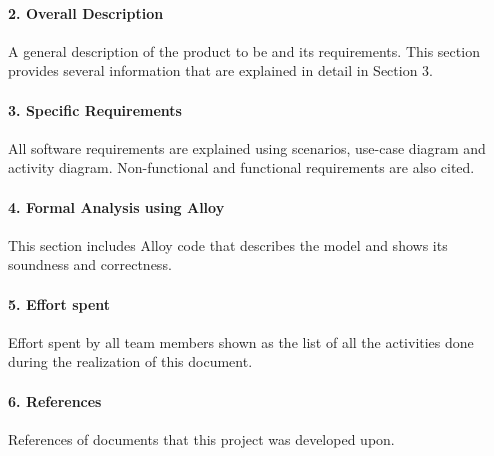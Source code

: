 \documentclass[../rasd.tex]{subfiles}
\begin{document}
		\paragraph{2. Overall Description}
		A general description of the product to be and its requirements. This section provides several information that are explained in detail in Section 3.
		\paragraph{3. Specific Requirements}
		All software requirements are explained using scenarios, use-case diagram and activity diagram. Non-functional and functional requirements are also cited.
		\paragraph{4. Formal Analysis using Alloy}
		This section includes Alloy code that describes the model and shows its soundness and correctness.
		\paragraph{5. Effort spent}
		Effort spent by all team members shown as the list of all the activities done during the realization of this document.
		\paragraph{6. References}
		References of documents that this project was developed upon.

		
\end{document}
